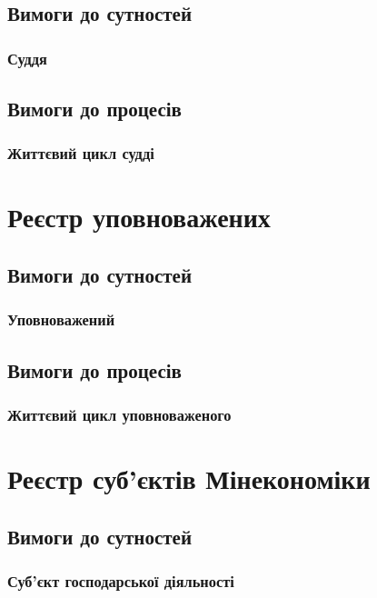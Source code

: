 \documentclass{article}
\begin{document}
\subsection{Вимоги до сутностей}

\subsubsection{Суддя}

\subsection{Вимоги до процесів}

\subsubsection{Життєвий цикл судді}

\newpage
\section{Реєстр уповноважених}

\subsection{Вимоги до сутностей}

\subsubsection{Уповноважений}

\subsection{Вимоги до процесів}

\subsubsection{Життєвий цикл уповноваженого}

\newpage
\section{Реєстр суб'єктів Мінекономіки}

\subsection{Вимоги до сутностей}

\subsubsection{Суб'єкт господарської діяльності}
\end{document}
